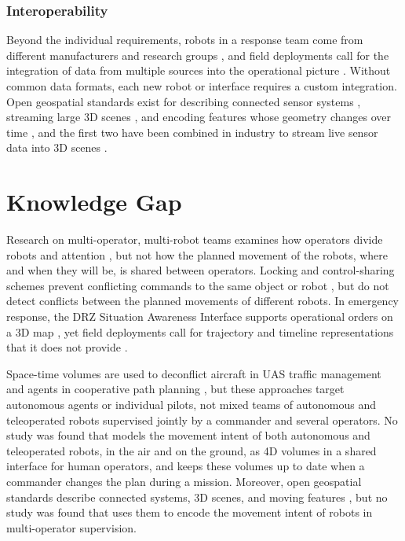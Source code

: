 \documentclass{article}
\begin{document}
\subsubsection{Interoperability}
Beyond the individual requirements, robots in a response team come from different manufacturers and research groups \cite{kruijff2021, surmann2024}, and field deployments call for the integration of data from multiple sources into the operational picture \cite{surmann2024}.
Without common data formats, each new robot or interface requires a custom integration.
Open geospatial standards exist for describing connected sensor systems \cite{ogc23001}, streaming large 3D scenes \cite{ogc3dtiles}, and encoding features whose geometry changes over time \cite{ogcmfjson}, and the first two have been combined in industry to stream live sensor data into 3D scenes \cite{georobotix2026}.

\section{Knowledge Gap}
Research on multi-operator, multi-robot teams examines how operators divide robots and attention \cite{gao2012teamwork}, but not how the planned movement of the robots, where and when they will be, is shared between operators.
Locking and control-sharing schemes prevent conflicting commands to the same object or robot \cite{greenberg1994concurrency, music2017control}, but do not detect conflicts between the planned movements of different robots.
In emergency response, the DRZ Situation Awareness Interface supports operational orders on a 3D map \cite{kruijff2021}, yet field deployments call for trajectory and timeline representations that it does not provide \cite{surmann2024}.

Space-time volumes are used to deconflict aircraft in UAS traffic management \cite{astmf3548} and agents in cooperative path planning \cite{silver2005}, but these approaches target autonomous agents or individual pilots, not mixed teams of autonomous and teleoperated robots supervised jointly by a commander and several operators.
No study was found that models the movement intent of both autonomous and teleoperated robots, in the air and on the ground, as 4D volumes in a shared interface for human operators, and keeps these volumes up to date when a commander changes the plan during a mission.
Moreover, open geospatial standards describe connected systems, 3D scenes, and moving features \cite{ogc23001, ogc3dtiles, ogcmfjson}, but no study was found that uses them to encode the movement intent of robots in multi-operator supervision.
\end{document}
